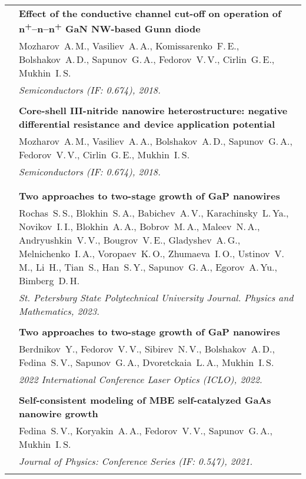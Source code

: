 \documentclass[letterpaper, 11pt]{article}
\begin{document}
\begin{longtable}{p{1.3in}p{4.8in}}
        & \textbf{Effect of the conductive channel cut-off on operation of
        n\textsuperscript{+}--n--n\textsuperscript{+} GaN NW-based Gunn diode}
        \\
        & Mozharov~A.\,M., Vasiliev~A.\,A., Komissarenko~F.\,E.,
        Bolshakov~A.\,D., Sapunov~G.\,A., Fedorov~V.\,V., Cirlin~G.\,E.,
        Mukhin~I.\,S. \\
		& \textit{Semiconductors (IF: 0.674), 2018.}\\
		& \\

        & \textbf{Core-shell III-nitride nanowire heterostructure: negative
        differential resistance and device application potential} \\
        & Mozharov~A.\,M., Vasiliev~A.\,A., Bolshakov~A.\,D., Sapunov~G.\,A.,
        Fedorov~V.\,V., Cirlin~G.\,E., Mukhin~I.\,S. \\
        & \textit{Semiconductors (IF: 0.674), 2018.}\\
		& \\

		\nohyphens{\color{OliveGreen}{Q4 Publications}} \\
        & \textbf{Two approaches to two-stage growth of GaP nanowires} \\
        & Rochas~S.\,S., Blokhin~S.\,A., Babichev~A.\,V., Karachinsky~L.\,Ya.,
        Novikov~I.\,I., Blokhin~A.\,A., Bobrov~M.\,A., Maleev~N.\,A., Andryushkin~V.\,V.,
        Bougrov~V.\,E., Gladyshev~A.\,G., Melnichenko~I.\,A., Voropaev~K.\,O., Zhumaeva~I.\,O.,
        Ustinov~V.\,M., Li~H., Tian~S., Han~S.\,Y., Sapunov~G.\,A., Egorov~A.\,Yu., Bimberg~D.\,H. \\
        & \textit{St. Petersburg State Polytechnical University Journal. Physics and Mathematics, 2023.} \\
		& \\

        & \textbf{Two approaches to two-stage growth of GaP nanowires} \\
        & Berdnikov~Y., Fedorov~V.\,V., Sibirev~N.\,V., Bolshakov~A.\,D.,
        Fedina~S.\,V., Sapunov~G.\,A., Dvoretckaia~L.\,A., Mukhin~I.\,S. \\
        & \textit{2022 International Conference Laser Optics (ICLO), 2022.}\\
		& \\

        & \textbf{Self-consistent modeling of MBE self-catalyzed GaAs nanowire
        growth} \\
        & Fedina~S.\,V., Koryakin~A.\,A., Fedorov~V.\,V., Sapunov~G.\,A.,
        Mukhin~I.\,S. \\
        & \textit{Journal of Physics: Conference Series (IF: 0.547), 2021.}\\
		& \\


\end{longtable}
\end{document}
